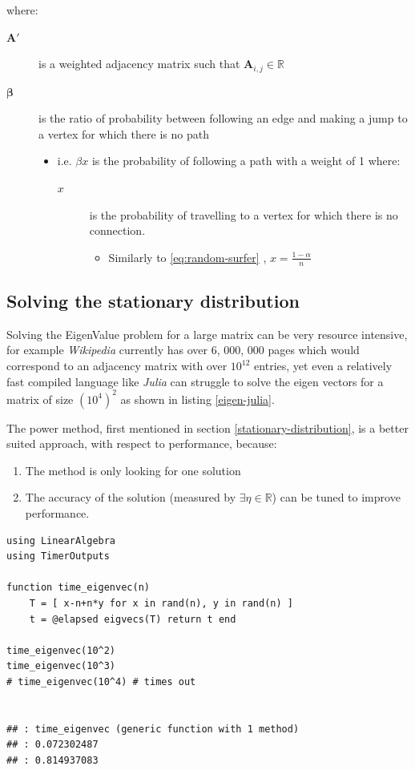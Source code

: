 \documentclass[11pt]{article}
\begin{document}
where:

\begin{description}
\item[{\(\mathbf{A'}\)}] is a weighted adjacency matrix such that \(\mathbf{A}_{i, j} \in \mathbb{R}\)
\item[{\(\mathbf{\beta}\)}] is the ratio of probability between following an edge and
making a jump to a vertex for which there is no path
\begin{itemize}
\item i.e. \(\beta x\) is the probability of following a path with a weight of 1 where:
\begin{description}
\item[{\(x\)}] is the probability of travelling to a vertex for which there is no connection.
\begin{itemize}
\item Similarly to \eqref{eq:random-surfer} , \(x = \frac{1-\alpha}{n}\)
\end{itemize}
\end{description}
\end{itemize}
\end{description}

\subsection{Solving the stationary distribution}
\label{iterative-power-method}
Solving the EigenValue problem for a large matrix can be very resource
intensive, for example \emph{Wikipedia} currently has over 6, 000, 000 pages
\cite{WikipediaSizeWikipedia2020} which would correspond to an adjacency matrix
with over \(10^{12}\) entries, yet even a relatively fast compiled language like
\emph{Julia} can struggle to solve the eigen vectors for a matrix of size
\((10^{4})^{2}\) as shown in listing \ref{eigen-julia}.

The power method, first mentioned in section \ref{stationary-distribution}, is a
better suited approach, with respect to performance, because:

\begin{enumerate}
\item The method is only looking for one solution
\item The accuracy of the solution (measured by  \(\exists\eta\in \mathbb{R}\)) can be tuned to improve performance.
\end{enumerate}



\begin{lstlisting}
using LinearAlgebra
using TimerOutputs

function time_eigenvec(n)
    T = [ x-n+n*y for x in rand(n), y in rand(n) ]
    t = @elapsed eigvecs(T) return t end

time_eigenvec(10^2)
time_eigenvec(10^3)
# time_eigenvec(10^4) # times out


## : time_eigenvec (generic function with 1 method)
## : 0.072302487
## : 0.814937083
\end{lstlisting}
\end{document}
